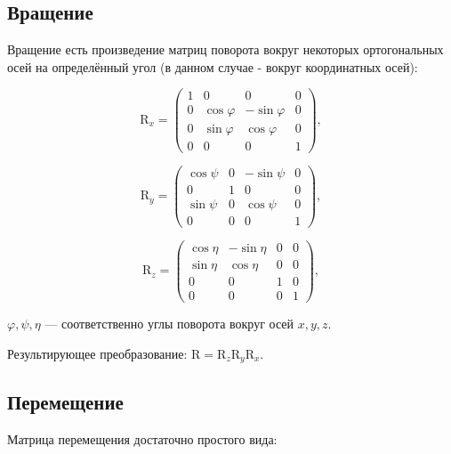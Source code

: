 \subsection{Вращение}
Вращение есть произведение матриц поворота вокруг некоторых ортогональных осей на 
определённый угол (в данном случае - вокруг координатных осей):

\begin{equation}
\mathrm{R}_x = 
  \begin{pmatrix}
    1 & 0  & 0 & 0\\
    0 & \cos\varphi & -\sin\varphi & 0\\
    0 & \sin\varphi & \cos\varphi & 0\\
    0 & 0 & 0 & 1
  \end{pmatrix},
\end{equation}

\begin{equation}
\mathrm{R}_y = 
  \begin{pmatrix}
    \cos\psi  & 0 & -\sin\psi & 0\\
    0 & 1 & 0 & 0 \\
    \sin\psi & 0 & \cos\psi & 0\\
    0 & 0 & 0 & 1
  \end{pmatrix},
\end{equation}

\begin{equation}
\mathrm{R}_z = 
  \begin{pmatrix}
    \cos\eta & -\sin\eta & 0 & 0 \\
    \sin\eta & \cos\eta  & 0 & 0\\
    0 & 0 & 1 & 0\\
    0 & 0 & 0 & 1
  \end{pmatrix},
\end{equation}
\begin{eqrem}
\begin{math} \varphi, \psi, \eta\end{math} --- соответственно углы поворота вокруг осей \begin{math}x, y, z\end{math}.
\end{eqrem}

Результирующее преобразование: \begin{math}\mathrm{R} = \mathrm{R}_z \mathrm{R}_y \mathrm{R}_x\end{math}.

\subsection{Перемещение}
Матрица перемещения достаточно простого вида:


